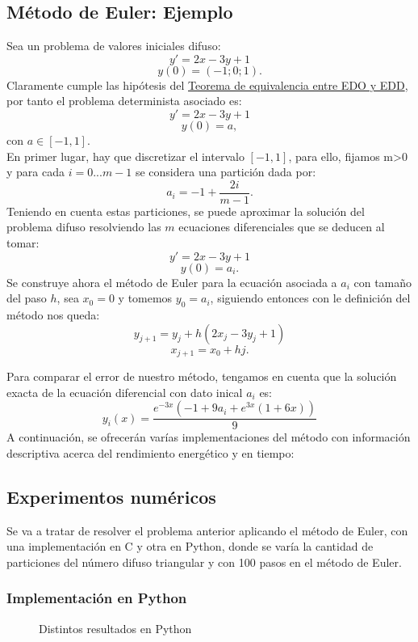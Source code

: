 \subsection{Método de Euler: Ejemplo}
\begin{ejemplo}
Sea un problema de valores iniciales difuso:
\[
y' = 2x - 3y + 1
\]
\[
y(0) = (-1;0;1).
\]
Claramente cumple las hipótesis del \hyperref[teorema:equivalencia]{Teorema de equivalencia entre EDO y EDD}, por tanto el problema determinista asociado es:
\[
y' = 2x - 3y + 1
\]
\[
y(0) = a,
\]
con $a \in [-1, 1]$. \\
En primer lugar, hay que discretizar el intervalo $[-1, 1]$, para ello, fijamos m>0 y para cada $i=0...m-1$ se considera una partición dada por:
\[
a_i = -1 + \frac{2i}{m-1}.
\]
Teniendo en cuenta estas particiones, se puede aproximar la solución del problema difuso resolviendo las $m$ ecuaciones diferenciales que se deducen al tomar:
\[
y' = 2x - 3y + 1
\]
\[
y(0) = a_i.
\]
Se construye ahora el método de Euler para la ecuación asociada a $a_i$ con tamaño del paso $h$, sea $x_0=0$ y tomemos $y_0 = a_i$, siguiendo entonces con le definición del método nos queda:
\[
y_{j+1} = y_j + h (2x_j - 3y_j + 1)
\]
\[
x_{j+1} = x_0 + hj.
\]

Para comparar el error de nuestro método, tengamos en cuenta que la solución exacta de la ecuación diferencial con dato inical $a_i$ es:
\[
y_i(x) = \frac{e^{-3 x} (-1 + 9 a_i + e^{3 x}(1 + 6 x))}{9}
\]
A continuación, se ofrecerán varías implementaciones del método con información descriptiva acerca del rendimiento energético y en tiempo:

\subsection{Experimentos numéricos}
Se va a tratar de resolver el problema anterior aplicando el método de Euler, con una implementación en C y otra en Python, donde se varía la cantidad de particiones del número difuso triangular y con 100 pasos en el método de Euler.
\subsubsection{Implementación en Python}
\begin{figure}[H]
	\centering
	\caption{Distintos resultados en Python}
	\label{fig:eulerpython}
\end{figure}


\end{ejemplo}
